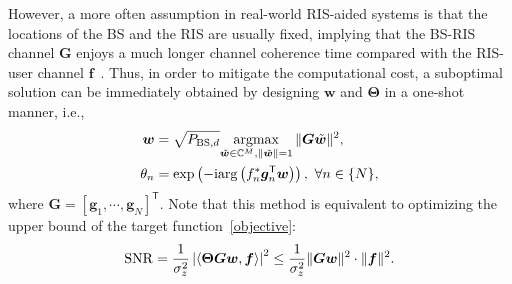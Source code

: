 \documentclass[journal,twocolumn]{IEEEtran}
\theoremstyle{nonumberplain}
\def \T {\bm \Theta}
\def \exp {\text{exp}}
\def \arg {\text{arg}}
\def \T {^{\mathsf{T}}}
\def \ri {{\rm i}}
\begin{document}
{    However, a more often assumption in real-world RIS-aided systems is that the locations of the \ac{BS} and the RIS are usually fixed, implying that the BS-RIS channel $\bm G$ enjoys a much longer channel coherence time compared with the RIS-user channel $\bm f$~\cite{Huchen}. Thus, in order to mitigate the computational cost, a suboptimal solution can be immediately obtained by designing $\bm w$ and $\bm\Theta$ in a one-shot manner, i.e., 
    \begin{equation}
        \begin{aligned}
            {\bm w} &= \sqrt{P_{{\rm BS}, d}}\underset{\tilde{\bm w}\in\mathbb{C}^M, \|\tilde{\bm w}\|=1}{\rm argmax}\,\|{\bm G}\tilde{\bm w}\|^2, \\
            \theta_{n} &= \exp\left(-\ri \arg\left(f_{n}^{*}\bm g_{n}\T \bm w\right)\right),~\forall n\in \{N\},
        \end{aligned}
        \label{traditional beamforming}
    \end{equation}
    where $\bm G = \left[\bm g_{1}, \cdots, \bm g_{N}\right]\T$. Note that this method is equivalent to optimizing the upper bound of the target function~\eqref{objective}:
    \begin{equation}
        {\rm SNR} = \frac{1}{\sigma_z^2}\left|\langle {\bm \Theta}{\bm G}{\bm w}, {\bm f}\rangle \right|^2 \leq \frac{1}{\sigma_z^2}\|{\bm G}{\bm w}\|^2\cdot \| {\bm f} \|^2.
    \end{equation} 
    }
\end{document}

